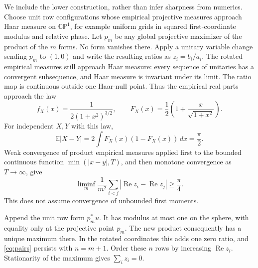 \documentclass[11pt]{article}
\DeclareMathOperator{\Ree}{Re}
\newcommand{\CP}{\mathbb {CP}}
\begin{document}
We include the lower construction, rather than infer sharpness from numerics.
Choose unit row configurations whose empirical projective measures approach
Haar measure on $\CP^1$, for example uniform grids in squared first-coordinate
modulus and relative phase. Let $p_m$ be any global projective maximizer of the
product of the $m$ forms. No form vanishes there. Apply a unitary variable change
sending $p_m$ to $(1,0)$ and write the resulting ratios as $z_i=b_i/a_i$.
The rotated empirical measures still approach Haar measure: every sequence of
unitaries has a convergent subsequence, and Haar measure is invariant under
its limit. The ratio map is continuous outside one Haar-null point.
Thus the empirical real parts approach the law
\[
 f_X(x)=\frac1{2(1+x^2)^{3/2}},\qquad
 F_X(x)=\frac12\left(1+\frac{x}{\sqrt{1+x^2}}\right).
\]
For independent $X,Y$ with this law,
\[
 \mathbb E|X-Y|=2\int F_X(x)(1-F_X(x))\,dx=\frac\pi2.
\]
Weak convergence of product empirical measures applied first to the bounded
continuous function $\min(|x-y|,T)$, and then monotone convergence as
$T\to\infty$, give
\begin{equation}\label{eq:pairs}
 \liminf_m\frac1{m^2}\sum_{i<j}|\Ree z_i-\Ree z_j|\ge\frac\pi4.
\end{equation}
This does not assume convergence of unbounded first moments.

Append the unit row form $p_m^*u$. It has modulus at most one on the sphere,
with equality only at the projective point $p_m$. The new product consequently
has a unique maximum there. In the rotated coordinates this adds one zero
ratio, and \eqref{eq:pairs} persists with $n=m+1$. Order these $n$ rows by
increasing $\Ree z_i$. Stationarity of the maximum gives $\sum_i z_i=0$.
\end{document}

